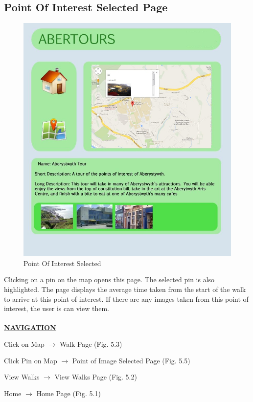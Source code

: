 \documentclass[12pt]{article}
\begin{document}
\subsection{Point Of Interest Selected Page}

\begin{figure}[htp]
\centering
\includegraphics[scale=0.50]{Project_Plan/Web/new_map_copy2.jpg}
\caption{Point Of Interest Selected}
\label{Point Of Interest Selected}
\end{figure}
\par{Clicking on a pin on the map opens this page. The selected pin is also highlighted. The page displays the average time taken from the start of the walk to arrive at this point of interest. If there are any images taken from this point of interest, the user is can view them.\\ \\}
\textbf{\uline{NAVIGATION}}
\par{Click on Map $\rightarrow$ Walk Page (Fig. 5.3)}
\par{Click Pin on Map $\rightarrow$ Point of Image Selected Page (Fig. 5.5)}
\par{View Walks $\rightarrow$ View Walks Page (Fig. 5.2)}
\par{Home $\rightarrow$ Home Page (Fig. 5.1)}
\clearpage
\end{document}
